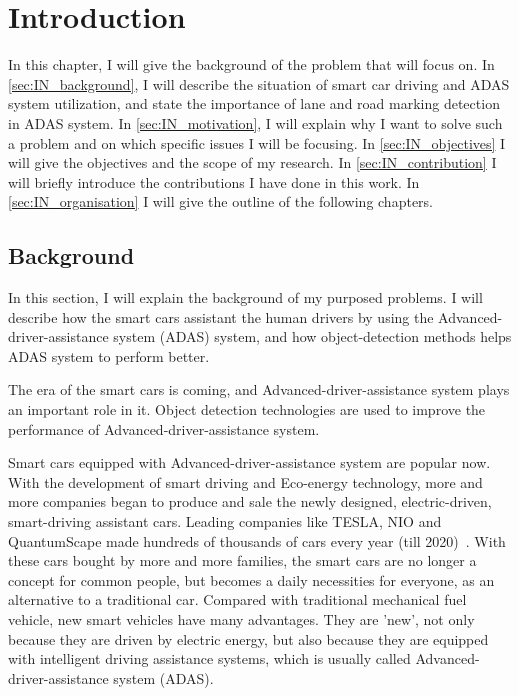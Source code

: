 
\chapter{Introduction}
\begin{spacing}{1.5}
\setlength{\parskip}{0.3in}

In this chapter, I will give the background of the problem that will focus on. In \autoref{sec:IN_background}, I will describe the situation of smart car driving and ADAS system utilization, and state the importance of lane and road marking detection in ADAS system. In \autoref{sec:IN_motivation}, I will explain why I want to solve such a problem and on which specific issues I will be focusing. In \autoref{sec:IN_objectives} I will give the objectives and the scope of my research. In \autoref{sec:IN_contribution} I will briefly introduce the contributions I have done in this work. In \autoref{sec:IN_organisation} I will give the outline of the following chapters.

\section{Background}
\label{sec:IN_background}

In this section, I will explain the background of my purposed problems. I will describe how the smart cars assistant the human drivers by using the Advanced-driver-assistance system (ADAS) system, and how object-detection methods helps ADAS system to perform better.

The era of the smart cars is coming, and Advanced-driver-assistance system plays an important role in it. Object detection technologies are used to improve the performance of Advanced-driver-assistance system.

Smart cars equipped with Advanced-driver-assistance system are popular now. With the development of smart driving and Eco-energy technology, more and more companies began to produce and sale the newly designed, electric-driven, smart-driving assistant cars. Leading companies like TESLA, NIO and QuantumScape made hundreds of thousands of cars every year (till 2020)~\cite{petranek2015we}. With these cars bought by more and more families, the smart cars are no longer a concept for common people, but becomes a daily necessities for everyone, as an alternative to a traditional car. Compared with traditional mechanical fuel vehicle, new smart vehicles have many advantages. They are 'new', not only because they are driven by electric energy, but also because they are equipped with intelligent driving assistance systems, which is usually called Advanced-driver-assistance system (ADAS).


\end{spacing}
